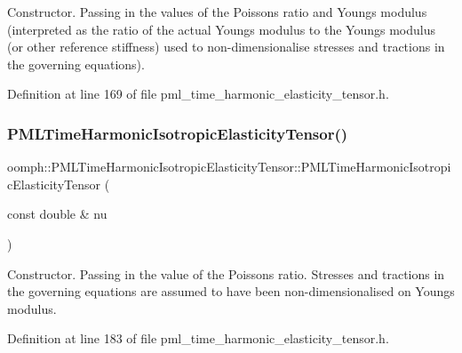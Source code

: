 Constructor. Passing in the values of the Poisson\textquotesingle{}s ratio and Young\textquotesingle{}s modulus (interpreted as the ratio of the actual Young\textquotesingle{}s modulus to the Young\textquotesingle{}s modulus (or other reference stiffness) used to non-\/dimensionalise stresses and tractions in the governing equations). 



Definition at line 169 of file pml\+\_\+time\+\_\+harmonic\+\_\+elasticity\+\_\+tensor.\+h.

\mbox{\label{classoomph_1_1PMLTimeHarmonicIsotropicElasticityTensor_a60b7dc4f2a2b71f5fdb4af8026134fbd}} 
\subsubsection{\texorpdfstring{P\+M\+L\+Time\+Harmonic\+Isotropic\+Elasticity\+Tensor()}{PMLTimeHarmonicIsotropicElasticityTensor()}\hspace{0.1cm}{\footnotesize\ttfamily [2/2]}}
{\footnotesize\ttfamily oomph\+::\+P\+M\+L\+Time\+Harmonic\+Isotropic\+Elasticity\+Tensor\+::\+P\+M\+L\+Time\+Harmonic\+Isotropic\+Elasticity\+Tensor (\begin{DoxyParamCaption}\item[{const double \&}]{nu }\end{DoxyParamCaption})\hspace{0.3cm}{\ttfamily [inline]}}



Constructor. Passing in the value of the Poisson\textquotesingle{}s ratio. Stresses and tractions in the governing equations are assumed to have been non-\/dimensionalised on Young\textquotesingle{}s modulus. 



Definition at line 183 of file pml\+\_\+time\+\_\+harmonic\+\_\+elasticity\+\_\+tensor.\+h.




